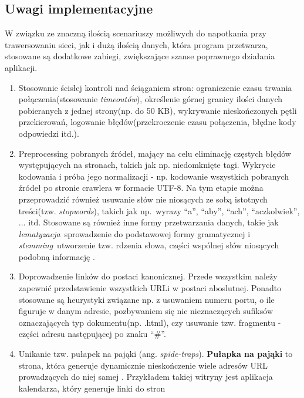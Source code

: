 
\subsection{Uwagi implementacyjne}
\label{subsec:uwagiImplement}

W związku ze znaczną ilością scenariuszy możliwych do napotkania przy trawersowaniu sieci, jak i dużą ilością danych, która program przetwarza,
stosowane są dodatkowe zabiegi, zwiększające szanse poprawnego działania aplikacji.
\begin{enumerate}
    \item Stosowanie ścisłej kontroli nad ściąganiem stron: ograniczenie czasu trwania połączenia(stosowanie \emph{timeoutów}),
          określenie górnej granicy ilości danych pobieranych z jednej strony(np. do 50 KB), wykrywanie nieskończonych pętli przekierowań,
          logowanie błędów(przekroczenie czasu połączenia, błędne kody odpowiedzi itd.).
    \item Preprocessing pobranych źródeł, mający na celu eliminację częstych błędów występujących na stronach, takich jak np. niedomknięte tagi.
          Wykrycie kodowania i próba jego normalizacji - np. kodowanie wszystkich pobranych źródeł po stronie crawlera w formacie UTF-8.
          Na tym etapie można przeprowadzić również usuwanie słów nie niosących ze sobą istotnych treści(tzw. \emph{stopwords}), takich jak 
          np.~wyrazy ``a'', ``aby'', ``ach'', ``aczkolwiek'', ... itd. Stosowane są również inne formy przetwarzania danych, takie jak
          \emph{lematyzacja}~sprowadzenie do podstawowej formy  gramatycznej i 
          \emph{stemming}~utworzenie tzw. rdzenia słowa, części wspólnej słów niosących podobną informację \cite{lemStem}.
    \item Doprowadzenie linków do postaci kanonicznej. Przede wszystkim należy zapewnić przedstawienie wszystkich URLi w postaci aboslutnej. Ponadto stosowane
          są heurystyki związane np. z usuwaniem numeru portu, o ile figuruje w danym adresie, pozbywaniem się nic nieznaczących sufiksów oznaczających 
          typ dokumentu(np. .html), czy usuwanie tzw. fragmentu - części adresu następującej po znaku ``\#''.
    \item Unikanie tzw. pułapek na pająki (ang. \emph{spide-traps}). \textbf{Pułapka na pająki} to strona, która generuje dynamicznie nieskończenie wiele 
          adresów URL prowadzących do niej samej \cite{spiderTraps}. Przykładem takiej witryny jest aplikacja kalendarza, który generuje linki do stron

\end{enumerate}
